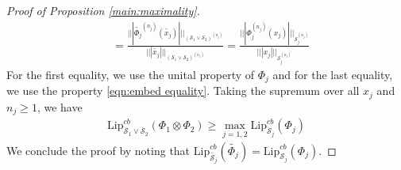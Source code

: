 \documentclass[11pt,reqno]{amsart}
\numberwithin{equation}{section}
\newcommand{\wt}{\widetilde}
\newcommand{\mc}{\mathcal}
\newcommand{\Lip}{\mathrm{Lip}}
\begin{document}
\begin{proof}[Proof of Proposition \ref{main:maximality}]
\begin{align*}
    &= \frac{|||\wt{\Phi_j}^{(n_j)}(\wt{x_j})|||_{(\mc S_1 \vee \mc S_2)^{(n_j)}}}{|||\wt{x_j}|||_{(\mc S_1 \vee \mc S_2)^{(n_j)}}}  = \frac{|||\Phi_j^{(n_j)}(x_j)|||_{\mc S_j^{(n_j)}}}{|||x_j|||_{\mc S_j^{(n_j)}} }
\end{align*}
For the first equality, we use the unital property of $\Phi_j$ and for the last equality, we use the property \eqref{eqn:embed equality}. Taking the supremum over all $x_j$ and $n_j\ge 1$, we have 
\begin{align*}
    \Lip^{cb}_{\mc S_1 \vee \mc S_2}(\Phi_1 \otimes \Phi_2) \ge \max_{j=1,2} \Lip_{\mc S_j}^{cb}(\Phi_j)
\end{align*}
We conclude the proof by noting that $\Lip_{\wt {\mc S_j}}^{cb}(\wt {\Phi_j}) = \Lip_{\mc S_j}^{cb}(\Phi_j)$.
\end{proof}

\end{document}
